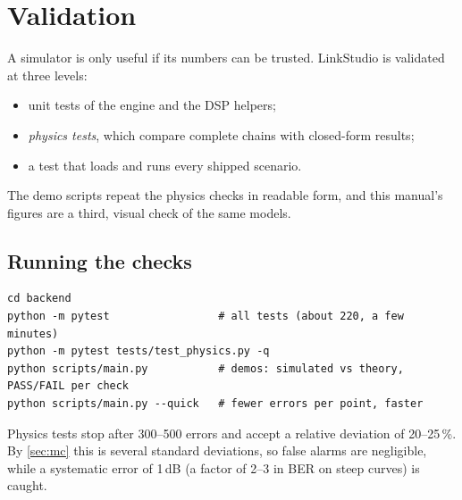 \chapter{Validation}\label{ch:validation}

A simulator is only useful if its numbers can be trusted. LinkStudio is validated at three levels:
\begin{itemize}
  \item unit tests of the engine and the DSP helpers;
  \item \emph{physics tests}, which compare complete chains with closed-form results;
  \item a test that loads and runs every shipped scenario.
\end{itemize}
The demo scripts repeat the physics checks in readable form, and this manual's figures are a
third, visual check of the same models.

\section{Running the checks}
\begin{lstlisting}[style=shell]
cd backend
python -m pytest                 # all tests (about 220, a few minutes)
python -m pytest tests/test_physics.py -q
python scripts/main.py           # demos: simulated vs theory, PASS/FAIL per check
python scripts/main.py --quick   # fewer errors per point, faster
\end{lstlisting}
Physics tests stop after 300--500 errors and accept a relative deviation of 20--25\,\%. By
\cref{sec:mc} this is several standard deviations, so false alarms are negligible, while a
systematic error of 1\,dB (a factor of 2--3 in BER on steep curves) is caught.

